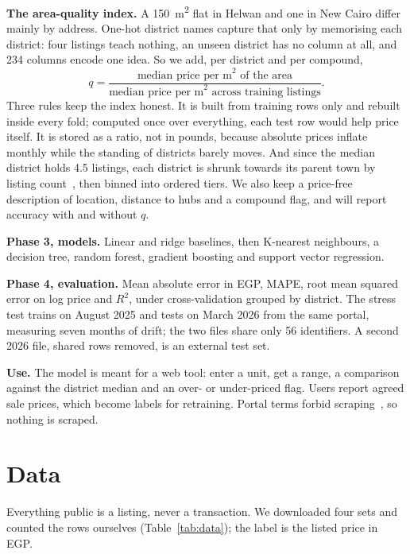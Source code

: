 \documentclass[sigconf,nonacm,10pt]{acmart}
\begin{document}
\textbf{The area-quality index.} A 150~m\textsuperscript{2} flat in Helwan and one in New Cairo differ mainly by address. One-hot district names capture that only by memorising each district: four listings teach nothing, an unseen district has no column at all, and 234 columns encode one idea. So we add, per district and per compound,
\[
q=\frac{\text{median price per m}^2\text{ of the area}}{\text{median price per m}^2\text{ across training listings}} .
\]
Three rules keep the index honest. It is built from training rows only and rebuilt inside every fold; computed once over everything, each test row would help price itself. It is stored as a ratio, not in pounds, because absolute prices inflate monthly while the standing of districts barely moves. And since the median district holds 4.5 listings, each district is shrunk towards its parent town by listing count~\cite{miccibarreca2001}, then binned into ordered tiers. We also keep a price-free description of location, distance to hubs and a compound flag, and will report accuracy with and without $q$.

\textbf{Phase 3, models.} Linear and ridge baselines, then K-nearest neighbours, a decision tree, random forest, gradient boosting and support vector regression.

\textbf{Phase 4, evaluation.} Mean absolute error in EGP, MAPE, root mean squared error on log price and $R^2$, under cross-validation grouped by district. The stress test trains on August 2025 and tests on March 2026 from the same portal, measuring seven months of drift; the two files share only 56 identifiers. A second 2026 file, shared rows removed, is an external test set.

\textbf{Use.} The model is meant for a web tool: enter a unit, get a range, a comparison against the district median and an over- or under-priced flag. Users report agreed sale prices, which become labels for retraining. Portal terms forbid scraping~\cite{pf_terms}, so nothing is scraped.

\section{Data}

Everything public is a listing, never a transaction. We downloaded four sets and counted the rows ourselves (Table~\ref{tab:data}); the label is the listed price in EGP.
\end{document}

